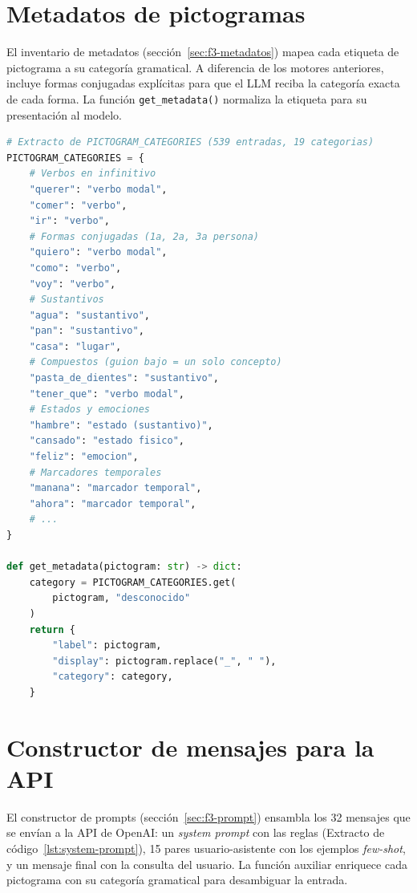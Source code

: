 \section{Metadatos de pictogramas}

El inventario de metadatos (sección~\ref{sec:f3-metadatos}) mapea cada etiqueta de pictograma a su categoría gramatical. A diferencia de los motores anteriores, incluye formas conjugadas explícitas para que el LLM reciba la categoría exacta de cada forma. La función \texttt{get\_metadata()} normaliza la etiqueta para su presentación al modelo.

\begin{lstlisting}[language=Python,caption={Metadatos de pictogramas y función de consulta (\texttt{pictogram\_metadata.py}).},label={lst:pictogram-metadata},basicstyle=\ttfamily\small,xleftmargin=1cm]
# Extracto de PICTOGRAM_CATEGORIES (539 entradas, 19 categorias)
PICTOGRAM_CATEGORIES = {
    # Verbos en infinitivo
    "querer": "verbo modal",
    "comer": "verbo",
    "ir": "verbo",
    # Formas conjugadas (1a, 2a, 3a persona)
    "quiero": "verbo modal",
    "como": "verbo",
    "voy": "verbo",
    # Sustantivos
    "agua": "sustantivo",
    "pan": "sustantivo",
    "casa": "lugar",
    # Compuestos (guion bajo = un solo concepto)
    "pasta_de_dientes": "sustantivo",
    "tener_que": "verbo modal",
    # Estados y emociones
    "hambre": "estado (sustantivo)",
    "cansado": "estado fisico",
    "feliz": "emocion",
    # Marcadores temporales
    "manana": "marcador temporal",
    "ahora": "marcador temporal",
    # ...
}

def get_metadata(pictogram: str) -> dict:
    category = PICTOGRAM_CATEGORIES.get(
        pictogram, "desconocido"
    )
    return {
        "label": pictogram,
        "display": pictogram.replace("_", " "),
        "category": category,
    }
\end{lstlisting}

\section{Constructor de mensajes para la API}

El constructor de prompts (sección~\ref{sec:f3-prompt}) ensambla los 32 mensajes que se envían a la API de OpenAI: un \textit{system prompt} con las reglas (Extracto de código~\ref{lst:system-prompt}), 15 pares usuario-asistente con los ejemplos \textit{few-shot}, y un mensaje final con la consulta del usuario. La función auxiliar enriquece cada pictograma con su categoría gramatical para desambiguar la entrada.

